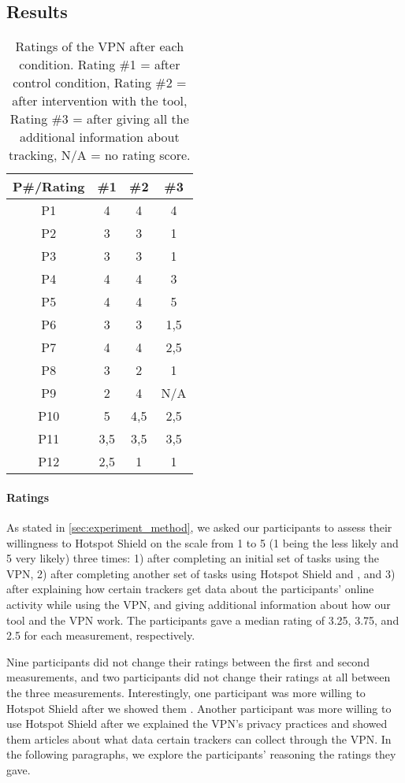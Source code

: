 \subsection{Results}\label{sec:results}

\begin{table}[h!]
\centering
\begin{tabular}{|c c c c|} 
 \hline
P\#/Rating & \#1 & \#2 & \#3 \\
\hline
P1 & 4 & 4 & 4\\
P2 & 3 & 3 & 1\\
P3 & 3 & 3 & 1\\
P4 & 4 & 4 & 3\\
P5 & 4 & 4 & 5\\
P6 & 3 & 3 & 1,5\\
P7 & 4 & 4 & 2,5\\
P8 & 3 & 2 & 1\\
P9 & 2 & 4 & N/A\\
P10 & 5 & 4,5 & 2,5\\
P11 & 3,5 & 3,5 & 3,5\\
P12 & 2,5 & 1 & 1 \\
 \hline
\end{tabular}
\caption{Ratings of the VPN after each condition. Rating \#1 = after control condition, Rating \#2 = after intervention with the tool, Rating \#3 = after giving all the additional information about tracking, N/A = no rating score.}
\label{table:2}
\end{table}

\paragraph{Ratings}

As stated in \ref{sec:experiment_method}, we asked our participants to assess their
willingness to Hotspot Shield on the scale from 1 to 5 (1 being the less likely
and 5 very likely) three times: 1) after completing an initial set of tasks using the
VPN, 2) after completing another set of tasks using Hotspot Shield and \tool, and
3) after explaining how certain trackers get data about the participants' online activity while using the VPN, and giving additional information about how our tool and the VPN work. The participants gave a median rating of 3.25, 3.75, and 2.5 for each measurement, respectively.

Nine participants did not change their ratings between the first and second measurements, and two participants did not change their ratings at
all between the three measurements. Interestingly, one participant was more willing to Hotspot Shield after we showed them \tool.  Another participant was more willing to
use Hotspot Shield after we explained the VPN's privacy practices and showed them articles about what data certain trackers can collect through the VPN. In the following paragraphs, we explore the participants' reasoning the ratings they gave.

